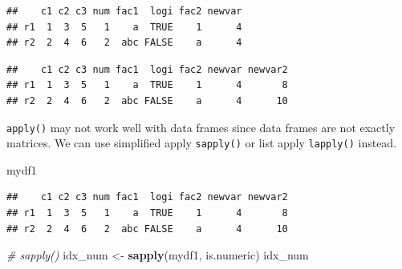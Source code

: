 \documentclass[]{book}
\newenvironment{Shaded}{\begin{snugshade}}{\end{snugshade}}
\newcommand{\KeywordTok}[1]{\textcolor[rgb]{0.13,0.29,0.53}{\textbf{{#1}}}}
\newcommand{\DecValTok}[1]{\textcolor[rgb]{0.00,0.00,0.81}{{#1}}}
\newcommand{\StringTok}[1]{\textcolor[rgb]{0.31,0.60,0.02}{{#1}}}
\newcommand{\CommentTok}[1]{\textcolor[rgb]{0.56,0.35,0.01}{\textit{{#1}}}}
\newcommand{\NormalTok}[1]{{#1}}
\theoremstyle{definition}
\theoremstyle{definition}
\theoremstyle{remark}
\begin{document}
\begin{Shaded}
\end{Shaded}

\begin{verbatim}
##    c1 c2 c3 num fac1  logi fac2 newvar
## r1  1  3  5   1    a  TRUE    1      4
## r2  2  4  6   2  abc FALSE    a      4
\end{verbatim}

\begin{Shaded}
\end{Shaded}

\begin{verbatim}
##    c1 c2 c3 num fac1  logi fac2 newvar newvar2
## r1  1  3  5   1    a  TRUE    1      4       8
## r2  2  4  6   2  abc FALSE    a      4      10
\end{verbatim}

\texttt{apply()} may not work well with data frames since data frames
are not exactly matrices. We can use simplified apply \texttt{sapply()}
or list apply \texttt{lapply()} instead.

\begin{Shaded}
\begin{Highlighting}[]
\NormalTok{mydf1 }
\end{Highlighting}
\end{Shaded}

\begin{verbatim}
##    c1 c2 c3 num fac1  logi fac2 newvar newvar2
## r1  1  3  5   1    a  TRUE    1      4       8
## r2  2  4  6   2  abc FALSE    a      4      10
\end{verbatim}

\begin{Shaded}
\begin{Highlighting}[]
\CommentTok{# sapply() }
\NormalTok{idx_num <-}\StringTok{ }\KeywordTok{sapply}\NormalTok{(mydf1, is.numeric) }
\NormalTok{idx_num}
\end{Highlighting}
\end{Shaded}
\end{document}

